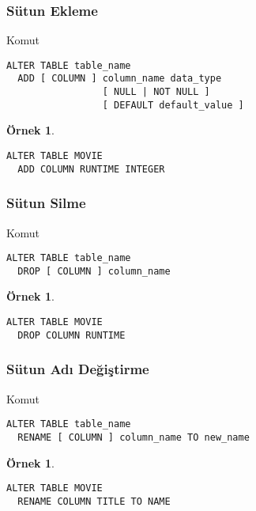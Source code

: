 \documentclass[dvipsnames]{beamer}
\theoremstyle{definition}
\theoremstyle{example}
\newtheorem{ornek}[theorem]{Örnek}
\theoremstyle{plain}
\begin{document}
\begin{frame}[fragile]
  \frametitle{Sütun Ekleme}

  \begin{block}{Komut}
    \begin{lstlisting}
ALTER TABLE table_name
  ADD [ COLUMN ] column_name data_type
                 [ NULL | NOT NULL ]
                 [ DEFAULT default_value ]
    \end{lstlisting}
  \end{block}

  \pause
  \medskip
  \begin{ornek}
    \begin{lstlisting}
ALTER TABLE MOVIE
  ADD COLUMN RUNTIME INTEGER
    \end{lstlisting}
  \end{ornek}
\end{frame}

\begin{frame}[fragile]
  \frametitle{Sütun Silme}

  \begin{block}{Komut}
    \begin{lstlisting}
ALTER TABLE table_name
  DROP [ COLUMN ] column_name
    \end{lstlisting}
  \end{block}

  \pause
  \medskip
  \begin{ornek}
    \begin{lstlisting}
ALTER TABLE MOVIE
  DROP COLUMN RUNTIME
    \end{lstlisting}
  \end{ornek}
\end{frame}

\begin{frame}[fragile]
  \frametitle{Sütun Adı Değiştirme}

  \begin{block}{Komut}
    \begin{lstlisting}
ALTER TABLE table_name
  RENAME [ COLUMN ] column_name TO new_name
    \end{lstlisting}
  \end{block}

  \pause
  \medskip
  \begin{ornek}
    \begin{lstlisting}
ALTER TABLE MOVIE
  RENAME COLUMN TITLE TO NAME
    \end{lstlisting}
  \end{ornek}
\end{frame}
\end{document}

